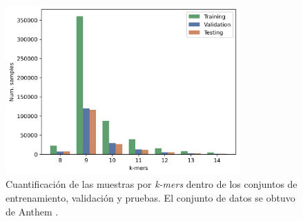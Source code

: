 \begin{figure}[H]
	\centering\includegraphics[width=0.8\textwidth]{../img/proposal/dataset_samples}
	\caption{
		Cuantificación de las muestras por \textit{k-mers} dentro de los conjuntos de entrenamiento, validación y pruebas. El conjunto de datos se obtuvo de Anthem \citep{mei2021anthem}.}
	\label{fig:samples}
\end{figure}



